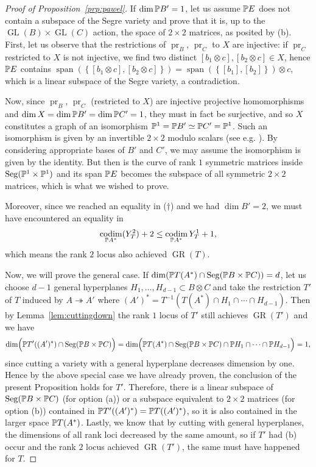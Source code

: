 \documentclass[a4paper,10pt]{article}
\def\set#1{\left\{#1\right\}}
\let\surjto\twoheadrightarrow
\DeclareMathOperator{\codim}{codim}
\DeclareMathOperator{\Seg}{Seg}
\DeclareMathOperator{\GR}{GR}
\DeclareMathOperator{\GL}{GL}
\DeclareMathOperator{\pr}{pr}
\DeclareMathOperator{\spn}{span}
\theoremstyle{definition}
\theoremstyle{remark}
\begin{document}
\begin{proof}[Proof of Proposition~\ref{prp:pawel}]
    If $\dim\pe B' = 1$, let us assume $\pe E$ does not contain a subspace of the Segre variety and prove that it is, up to the $\GL(B)\times\GL(C)$ action, the space of $2\times2$ matrices, as posited by (b). First, let us observe that the restrictions of $\pr_B$, $\pr_C$ to $X$ are injective: if $\pr_C$ restricted to $X$ is not injective, we find two distinct $[b_1\otimes c], [b_2\otimes c]\in X$, hence $\pe E$ contains $\spn(\set{[b_1\otimes c], [b_2\otimes c]}) = \spn(\set{[b_1], [b_2]})\otimes c$, which is a linear subspace of the Segre variety, a contradiction.

    Now, since $\pr_B$, $\pr_C$ (restricted to $X$) are injective projective homomorphisms and $\dim X = \dim \pe B' = \dim\pe C' = 1$, they must in fact be surjective, and so $X$ constitutes a graph of an isomorphism $\pe^1 = \pe B' \simeq \pe C' = \pe^1$. Such an isomorphism is given by an invertible $2\times 2$ modulo scalars (see e.g. \cite[15.5.A]{rising-sea}). By considering appropriate bases of $B'$ and $C'$, we may assume the isomorphism is given by the identity. But then is the curve of rank $1$ symmetric matrices inside $\Seg(\pe^1\times\pe^1)$ and its span $\pe E$ becomes the subspace of all symmetric $2\times 2$ matrices, which is what we wished to prove.

    Moreover, since we reached an equality in ($\dag$) and we had $\dim B'=2$, we must have encountered an equality in
    \[
        \codim_{\pe A^*}(Y^2_T)+2 \leq \codim_{\pe A^*}Y^1_T + 1,
    \]
    which means the rank $2$ locus also achieved $\GR(T)$.


    \bigskip
    Now, we will prove the general case. If $\dim(\pe T(A^*)\cap \Seg(\pe B\times\pe C))=d$, let us choose $d-1$ general hyperplanes $H_1,\dots,H_{d-1}\subset B\otimes C$ and take the restriction $T'$ of $T$ induced by $A\surjto A'$ where $(A')^* = T^{-1}(T(A^*)\cap H_1\cap\cdots\cap H_{d-1})$. Then by Lemma~\ref{lem:cuttingdown} the rank $1$ locus of $T'$ still achieves $\GR(T')$ and we have
    \[
        \dim\Bigl(\pe T'((A')^*)\cap \Seg(\pe B\times\pe C)\Bigr) = \dim\Bigl(\pe T(A^*)\cap \Seg(\pe B\times\pe C)\cap \pe H_1\cap\cdots\cap \pe H_{d-1}\Bigr) = 1,
    \]
    since cutting a variety with a general hyperplane decreases dimension by one.
    Hence by the above special case we have already proven, the conclusion of the present Proposition holds for $T'$. Therefore, there is a linear subspace of $\Seg(\pe B\times \pe C)$ (for option (a)) or a subspace equivalent to $2\times 2$ matrices (for option (b)) contained in $\pe T'((A')^*) = \pe T((A')^*)$, so it is also contained in the larger space $\pe T(A^*)$. Lastly, we know that by cutting with general hyperplanes, the dimensions of all rank loci decreased by the same amount, so if $T'$ had (b) occur and the rank $2$ locus achieved $\GR(T')$, the same must have happened for $T$.
\end{proof}
\end{document}
